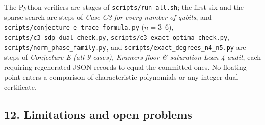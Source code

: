 \documentclass[11pt,a4paper]{article}
\begin{document}
The Python verifiers are stages of \nolinkurl{scripts/run_all.sh}; the first six and the sparse search are steps of
\emph{Case C3 for every number of qubits}, and \nolinkurl{scripts/conjecture_e_trace_formula.py} (\(n=3\text{–}6\)),
\nolinkurl{scripts/c3_sdp_dual_check.py}, \nolinkurl{scripts/c3_exact_optima_check.py}, \nolinkurl{scripts/norm_phase_family.py}, and
\nolinkurl{scripts/exact_degrees_n4_n5.py} are steps of \emph{Conjecture E (all 9 cases), Kramers floor \& saturation
Lean 4 audit}, each requiring regenerated JSON records to equal the committed ones. No floating point
enters a comparison of characteristic polynomials or any integer dual certificate.

\subsection{12. Limitations and open problems}\label{12-limitations-and-open-problems}
\end{document}
